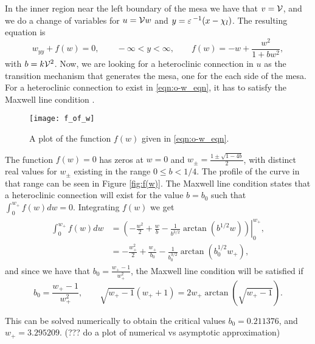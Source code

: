 In the inner region near the left boundary of the mesa we have that $v=\mathcal{V}$, and we do a change of variables for $u=\mathcal{V} w$ and $y=\varepsilon\,^{-1}(x-\chi_l)$. The resulting equation is
% 
\begin{equation}
\label{eqn:o-w_eqn}
  w_{yy}+f(w)=0, \qquad -\infty<y<\infty,\qquad f(w) = -w + \frac{w^2}{1+bw^2},
\end{equation}
% 
with $b = k\mathcal{V}^2$. Now, we are looking for a heteroclinic connection in $u$ as the transition mechanism that generates the mesa, one for the each side of the mesa. For a heteroclinic connection to exist in \eqref{eqn:o-w_eqn}, it has to satisfy the Maxwell line condition \cite{maxwell1994}.
% 
\begin{figure}[htb]
\begin{center}
\texttt{[image: f\_of\_w]}
\caption{A plot of the function $f(w)$ given in \eqref{eqn:o-w_eqn}.}
\label{fig:f(w)}
\end{center}
\end{figure}
% 

The function $f(w)=0$ has zeros at $w=0$ and $w_{\pm} = \frac{1\pm\sqrt{1-4b}}{2}$, with distinct real values for $w_{\pm}$ existing in the range $0\le b<1/4$. The profile of the curve in that range can be seen in Figure \eqref{fig:f(w)}. The Maxwell line condition states that a heteroclinic connection will exist for the value $b=b_0$ such that $\int_0^{w_+} f(w)dw = 0$. Integrating $f(w)$ we get
% 
\begin{equation*}
\begin{split}
\begin{aligned}
  \int_0^{w_+} f(w)dw &= \left.\left(-\frac{w^2}{2} + \frac{w}{b} - \frac{1}{b^{3/2}}\arctan(b^{1/2}w) \right)\right|_0^{w_+},\\
  & = -\frac{w_+^2}{2} + \frac{w_+}{b_0} - \frac{1}{b_0^{3/2}}\arctan(b_0^{1/2}w_+),
\end{aligned}
\end{split}
\end{equation*}
% 
and since we have that $b_0 = \frac{w_+-1}{w_+^2}$, the Maxwell line condition will be satisfied if
% 
\begin{equation}
\label{eqn:maxwell2}
b_0 = \frac{w_+-1}{w_+^2},\qquad \sqrt{w_+-1}(w_++1)=2w_+\arctan(\sqrt{w_+-1}).
\end{equation}

This can be solved numerically to obtain the critical values $b_0 = 0.211376$, and $w_+ = 3.295209$. (??? do a plot of numerical vs asymptotic approximation)

